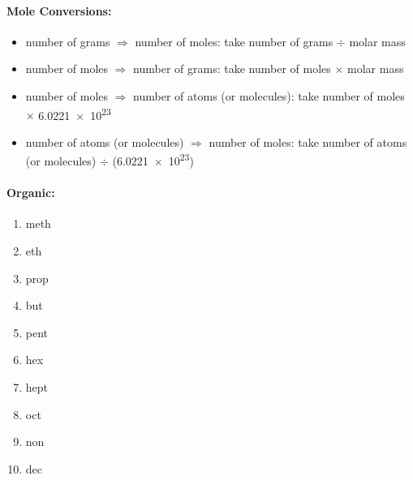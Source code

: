 \documentclass[9pt]{article}
\begin{document}
\paragraph{\textsf{Mole Conversions:}}
\begin{itemize}
    \item number of grams \( \Rightarrow \) number of moles: take number of grams \( \div \) molar mass
    \item number of moles \( \Rightarrow \) number of grams: take number of moles \( \times \) molar mass
    \item number of moles \( \Rightarrow \) number of atoms (or molecules): take number of moles \( \times \) \num{6.0221e23}
    \item number of atoms (or molecules) \( \Rightarrow \) number of moles: take number of atoms (or molecules) \( \div \) (\num{6.0221e23})
\end{itemize}

\paragraph{\textsf{Organic:}}

\begin{multicols}{2}

    \begin{enumerate}
        \item meth
        \item eth
        \item prop
        \item but
        \item pent
        \item hex
        \item hept
        \item oct
        \item non
        \item dec
    \end{enumerate}
\end{multicols}
\end{document}
